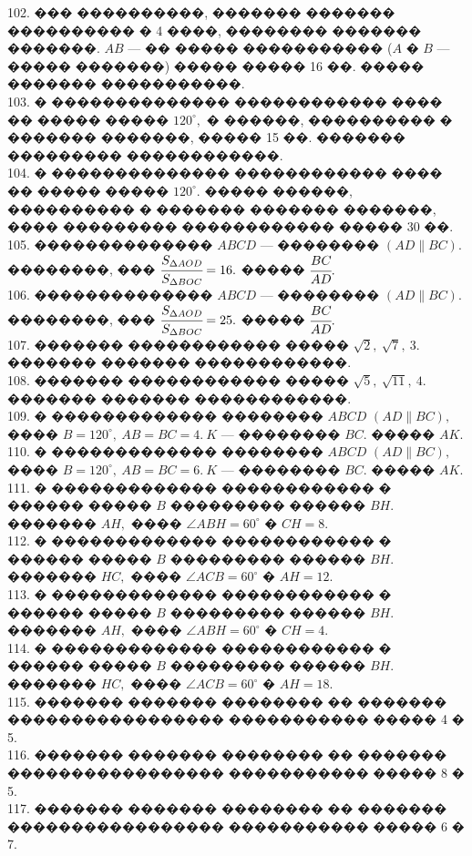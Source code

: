 \documentclass[12pt]{article}
\begin{document}
102. ��� ����������, ������� ������� ���������� � 4 ����, �������� ������� �������. $AB$ --- �� ����� ����������� ($A$ � $B$ --- ����� �������) ����� ����� 16 ��. ����� ������� �����������.\\
103. � �������������� ������������ ���� �� ����� ����� $120^\circ,$ � ������, ���������� � ������� �������, ����� 15 ��. ������� ��������� ������������.\\
104. � �������������� ������������ ���� �� ����� ����� $120^\circ.$ ����� ������, ���������� � ������� ������� �������, ���� ��������� ������������ ����� 30 ��.\\
105. �������������� $ABCD$ --- �������� $(AD\parallel BC).$ ��������, ��� $\cfrac{S_{\Delta AOD}}{S_{\Delta BOC}}=16.$ ����� $\cfrac{BC}{AD}.$\\
106. �������������� $ABCD$ --- �������� $(AD\parallel BC).$ ��������, ��� $\cfrac{S_{\Delta AOD}}{S_{\Delta BOC}}=25.$ ����� $\cfrac{BC}{AD}.$\\
107. ������� ������������ ����� $\sqrt{2},\ \sqrt{7},\ 3.$ ������� ������� ������������.\\
108. ������� ������������ ����� $\sqrt{5},\ \sqrt{11},\ 4.$ ������� ������� ������������.\\
109. � ������������� �������� $ABCD$ $(AD\parallel BC),$ ���� $B=120^\circ,\ AB=BC=4.\ K$ --- �������� $BC.$ ����� $AK.$\\
110. � ������������� �������� $ABCD$ $(AD\parallel BC),$ ���� $B=120^\circ,\ AB=BC=6.\ K$ --- �������� $BC.$ ����� $AK.$\\
111. � ������������� ������������ � ������ ����� $B$ ��������� ������ $BH.$ ������� $AH,$ ���� $\angle ABH=60^\circ$ � $CH=8.$\\
112. � ������������� ������������ � ������ ����� $B$ ��������� ������ $BH.$ ������� $HC,$ ���� $\angle ACB=60^\circ$ � $AH=12.$\\
113. � ������������� ������������ � ������ ����� $B$ ��������� ������ $BH.$ ������� $AH,$ ���� $\angle ABH=60^\circ$ � $CH=4.$\\
114. � ������������� ������������ � ������ ����� $B$ ��������� ������ $BH.$ ������� $HC,$ ���� $\angle ACB=60^\circ$ � $AH=18.$\\
115. ������� ������� �������� �� ������� ����������������� ����������� ����� 4 � 5.\\
116. ������� ������� �������� �� ������� ����������������� ����������� ����� 8 � 5.\\
117. ������� ������� �������� �� ������� ����������������� ����������� ����� 6 � 7.\\
\end{document}

